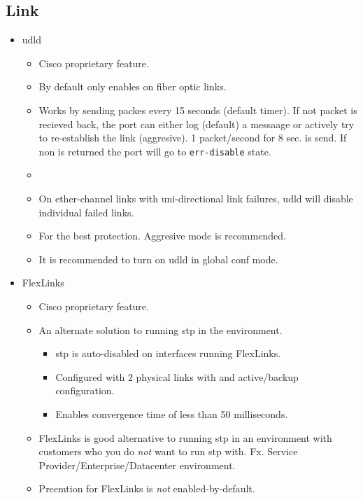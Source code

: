 \subsection{Link}

\begin{itemize}
    \item \gls{udld}
    \begin{itemize}
        \item Cisco proprietary feature.
        \item By default only enables on fiber optic links.
        \item Works by sending packes every 15 seconds (default timer). If not packet is recieved back, the port can either log (default) a messaage or actively try to re-establish the link (aggresive). 1 packet/second for 8 sec. is send. If non is returned the port will go to \texttt{err-disable} state.
        \item {}
        \item On ether-channel links with uni-directional link failures, udld will disable individual failed links.
        \item For the best protection. Aggresive mode is recommended.
        \item It is recommended to turn on udld in global conf mode.
    \end{itemize}
    \item FlexLinks
    \begin{itemize}
        \item Cisco proprietary feature.
        \item An alternate solution to running \gls{stp} in the environment.
        \begin{itemize}
            \item \gls{stp} is auto-disabled on interfaces running FlexLinks.
            \item Configured with 2 physical links with and active/backup configuration.
            \item Enables convergence time of less than 50 milliseconds.
        \end{itemize}
        \item FlexLinks is good alternative to running \gls{stp} in an environment with customers who you do \textit{not} want to run \gls{stp} with. Fx. Service Provider/Enterprise/Datacenter environment.
        \item Preemtion for FlexLinks is \textit{not} enabled-by-default.

\end{itemize}
\end{itemize}
